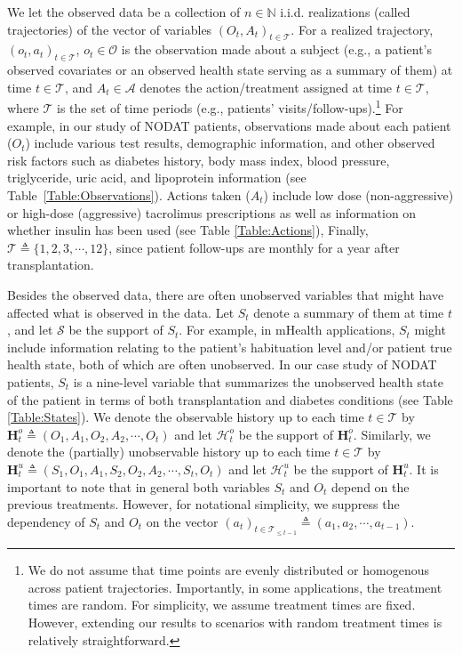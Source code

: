 \documentclass[opre,nonblindrev]{informs2}%
\newcommand{\teq}{\triangleq}
\newcommand{\1}{\hbox{\rm 1\kern-.35em 1}}
\newcommand{\MS}{\mathscr S}
\newcommand{\MA}{\mathscr A}
\newcommand{\MO}{\mathscr O}
\newcommand{\MT}{\mathscr T}
\newcommand{\MH}{\mathscr H}
\newcommand{\bH}{\mathbf{H}}
\begin{document}
 We let the observed data be a collection of $n\in\mathbb N$ i.i.d. realizations (called trajectories) of the vector of variables $(O_t, A_t)_{t\in \MT}$. For a realized trajectory, $(o_t, a_t)_{t\in \MT}$, $o_t\in\MO$ is the observation made about a subject (e.g., a patient's observed covariates or an observed health state serving as a summary of them) at time $t\in\MT$,  and $A_t\in\MA$ denotes the action/treatment assigned at time $t\in\MT$, where $\MT$ is the set of time periods (e.g., patients' visits/follow-ups).\footnote{We do not assume that time points are evenly distributed or homogenous across patient trajectories. Importantly, in some applications, the treatment times are random. For simplicity, we assume treatment times are fixed. However, extending our results to scenarios with random treatment times is  relatively straightforward.} For example, in our study of NODAT patients, observations made about each patient ($O_t$) include various test results, demographic information, and other observed risk factors such as diabetes history, body mass index, blood pressure, triglyceride, uric acid, and lipoprotein information (see Table~\ref{Table:Observations}). Actions taken ($A_t$) include low dose (non-aggressive) or high-dose (aggressive) tacrolimus prescriptions as well as information on whether insulin has been used (see Table \ref{Table:Actions}), Finally,  $\MT\teq\{1, 2, 3,\cdots, 12\}$, since patient follow-ups are monthly for a year  after transplantation.

Besides the observed data, there are often unobserved variables that might have affected what is observed in the data. Let $S_t$ denote a summary of them at time $t$, and let $\MS$ be the support of $S_t$. For example, in mHealth applications, $S_t$ might include information relating to the patient's habituation level \citep[see, e.g.,][]{Saghafian2021}  and/or patient true health state, both of which are often unobserved. In our case study of NODAT patients,  $S_t$ is a nine-level variable that summarizes the  unobserved  health state of the patient in terms of both transplantation and diabetes conditions   (see Table \ref{Table:States}). We denote the observable history up to  each time $t\in\MT$ by $\bH^o_t\teq(O_1, A_1, O_2, A_2,\cdots, O_t)$ and let $\MH_t^o$ be the support of $\bH^o_t$. Similarly, we denote the (partially) unobservable history up to  each time $t\in\MT$ by $\bH^u_t\teq(S_1, O_1, A_1, S_2, O_2, A_2, \cdots, S_t, O_t)$ and let $\MH_t^u$ be the support of $\bH^u_t$. It is important to note that in general both variables $S_t$ and $O_t$ depend on the previous treatments. However,  for notational simplicity, we suppress the dependency of $S_t$ and $O_t$ on the vector $(a_t)_{t\in\MT_{\leq t-1}}\teq (a_1, a_2, \cdots, a_{t-1})$.
\end{document}
